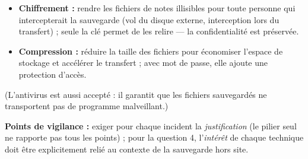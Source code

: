 \documentclass[11pt]{article}
\begin{document}
\begin{corrige}
\begin{enumerate}
\begin{itemize}
\item \textbf{Chiffrement :} rendre les fichiers de notes illisibles pour toute personne qui intercepterait la sauvegarde (vol du disque externe, interception lors du transfert) ; seule la clé permet de les relire — la confidentialité est préservée.
\item \textbf{Compression :} réduire la taille des fichiers pour économiser l'espace de stockage et accélérer le transfert ; avec mot de passe, elle ajoute une protection d'accès.
\end{itemize}
(L'antivirus est aussi accepté : il garantit que les fichiers sauvegardés ne transportent pas de programme malveillant.)
\end{enumerate}
\textbf{Points de vigilance :} exiger pour chaque incident la \emph{justification} (le pilier seul ne rapporte pas tous les points) ; pour la question 4, l'\emph{intérêt} de chaque technique doit être explicitement relié au contexte de la sauvegarde hors site.
\end{corrige}
\end{document}
